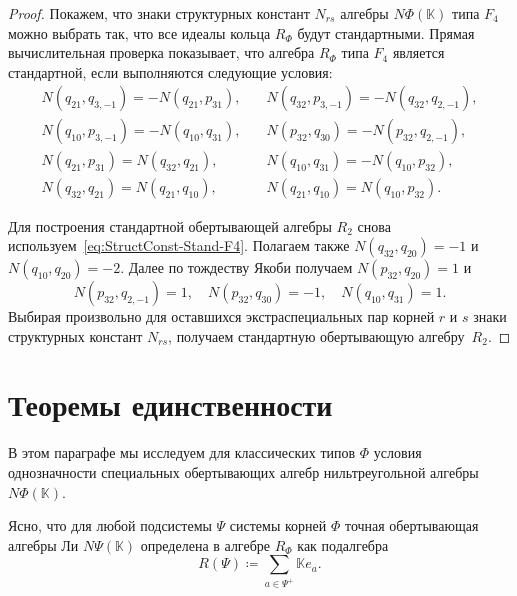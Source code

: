 \documentclass[a4paper,14pt,oneside,openany]{memoir}
\begin{document}
\begin{proof}
    Покажем, что знаки структурных констант $N_{rs}$ алгебры $N\Phi(\mathbb{K})$
    типа $F_4$ можно выбрать так, что все идеалы кольца $R_\Phi$ будут
    стандартными. Прямая вычислительная проверка показывает, что алгебра $R_\Phi$
    типа $F_4$ является стандартной, если выполняются следующие условия:
    \begin{equation*}%
        \begin{aligned}
            N(q_{21},q_{3,-1}) = -N(q_{21},p_{31}), \quad & N(q_{32},p_{3,-1}) =
            -N(q_{32},q_{2,-1}),                                                 \\
            N(q_{10},p_{3,-1}) = -N(q_{10},q_{31}), \quad & N(p_{32},q_{30}) =
            -N(p_{32},q_{2,-1}),                                                 \\
            N(q_{21},p_{31}) = N(q_{32},q_{21}), \quad    & N(q_{10},q_{31}) =
            -N(q_{10},p_{32}),                                                   \\
            N(q_{32},q_{21}) = N(q_{21},q_{10}), \quad    & N(q_{21},q_{10}) =
            N(q_{10},p_{32}) .
        \end{aligned}
    \end{equation*}

    Для построения стандартной обертывающей алгебры $R_2$ снова
    используем~\eqref{eq:StructConst-Stand-F4}. Полагаем также $N(q_{32},q_{20}) =
    -1$ и $N(q_{10},q_{20})=- 2$. Далее по тождеству Якоби получаем
    $N(p_{32},q_{20}) = 1$ и
    \begin{equation*}
        N(p_{32},q_{2,-1}) = 1,\quad
        N(p_{32},q_{30}) = -1,\quad
        N(q_{10},q_{31}) = 1.
    \end{equation*}
    Выбирая произвольно для оставшихся экстраспециальных пар корней $r$ и $s$ знаки
    структурных констант $N_{rs}$, получаем стандартную обертывающую алгебру~$R_2$.
\end{proof}

\section{Теоремы единственности}\label{sec:uniqtheorems}
%
В этом параграфе мы исследуем для классических типов $\Phi$ условия
однозначности специальных обертывающих алгебр нильтреугольной алгебры
$N\Phi(\mathbb{K})$.

\medskip

Ясно, что для любой подсистемы $\Psi$ системы корней $\Phi$ точная обертывающая
алгебры Ли $N\Psi(\mathbb{K})$ определена в алгебре $R_{\Phi}$ как подалгебра
\[
    R(\Psi)\coloneq\sum_{a \in \Psi^+}\mathbb{K}e_a.
\]
\end{document}
